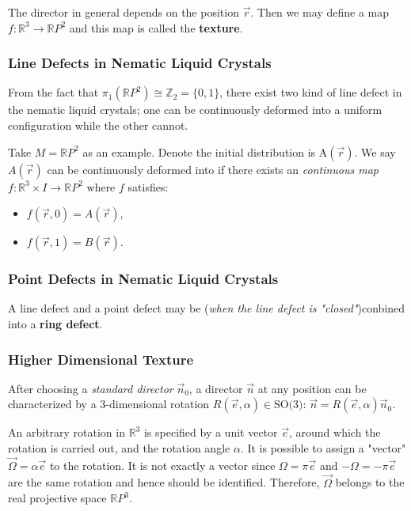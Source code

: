 \documentclass[10pt]{article}
\begin{document}
The director in general depends on the position $\vec{r}$.
Then we may define a map $f:\mathbb{R}^3\to\mathbb{R}P^2$ and this map is called the \textbf{texture}.

\subsubsection{Line Defects in Nematic Liquid Crystals}
From the fact that $\pi_1(\mathbb{R}P^2)\cong\mathbb{Z}_2=\{0,1\}$, there exist two kind of line defect in the nematic liquid crystals;
one can be continuously deformed into a uniform configuration while the other cannot.
\begin{remark}
    Take $M=\mathbb{R}P^2$ as an example.
    Denote the initial distribution is A$(\vec{r})$.
    We say $A(\vec{r})$ can be continuously deformed into if there exists an \textit{continuous map} $f:\mathbb{R}^3\times I\to\mathbb{R}P^2$ where $f$ satisfies:
    \begin{itemize}
        \item $f(\vec{r},0)=A(\vec{r})$,
        \item $f(\vec{r},1)=B(\vec{r})$.
    \end{itemize}
\end{remark}

\subsubsection{Point Defects in Nematic Liquid Crystals}
A line defect and a point defect may be (\textit{when the line defect is "closed"})conbined into a \textbf{ring defect}.

\subsubsection{Higher Dimensional Texture}
After choosing a \textit{standard director} $\vec{n}_0$, a director $\vec{n}$ at any position can be characterized by a 3-dimensional rotation $R(\vec{e},\alpha)\in\text{SO(3)}$: $\vec{n}=R(\vec{e},\alpha)\vec{n}_0$.

An arbitrary rotation in $\mathbb{R}^3$ is specified by a unit vector $\vec{e}$, around which the rotation is carried out, and the rotation angle $\alpha$.
It is possible to assign a "vector" $\vec{\Omega}=\alpha \vec{e}$ to the rotation.
It is not exactly a vector since $\Omega =\pi\vec{e}$ and $-\Omega=-\pi\vec{e}$ are the same rotation and hence should be identified.
Therefore, $\vec{\Omega}$ belongs to the real projective space $\mathbb{R}P^3$.
\end{document}
